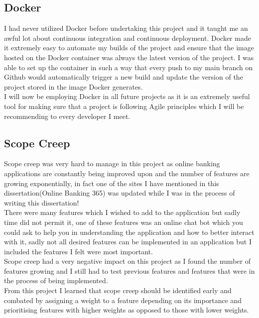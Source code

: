 \subsection{Docker}
I had never utilized Docker before undertaking this project and it taught me an
awful lot about continuous integration and continuous deployment.  Docker made it
extremely easy to automate my builds of the project and ensure that the image hosted
on the Docker container was always the latest version of the project.  I was able to
set up the container in such a way that every push to my main branch on Github would
automatically trigger a new build and update the version of the project stored in the
image Docker generates.
\\
I will now be employing Docker in all future projects as it is an extremely useful tool
for making sure that a project is following Agile principles
which I will be recommending to every developer I meet.
\subsection{Scope Creep}
Scope creep was very hard to manage in this project as online banking applications
are constantly being improved upon and the number of features are growing exponentially, in fact
one of the sites I have mentioned in this dissertation(Online Banking 365) was updated while I was
in the process of writing this dissertation!
\\
There were many features which I wished to add to the application but sadly time did not permit it,
one of these features was an online chat bot which you could ask to help you in understanding the application
and how to better interact with it, sadly not all desired features can be implemented in an application but I included the
features I felt were most important.
\\
Scope creep had a very negative impact on this project as I found the number of features growing and I still had
to test previous features and features that were in the process of being implemented.
\\
From this project I learned that scope creep should be identified early and combated by assigning a weight to a feature depending on its importance and prioritising features with higher weights as opposed to those with lower weights.
